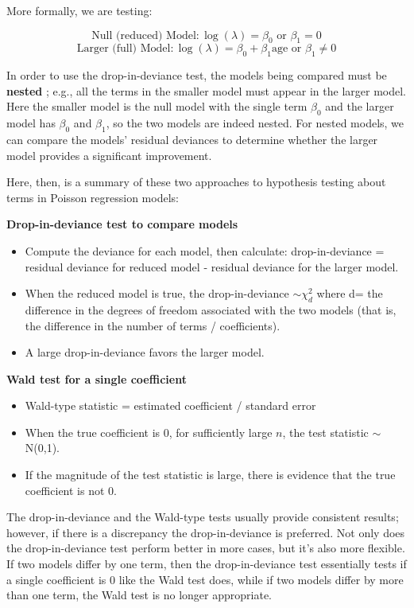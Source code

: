 \documentclass[
]{krantz}
\providecommand{\tightlist}{%
  \setlength{\itemsep}{0pt}\setlength{\parskip}{0pt}}
\begin{document}
More formally, we are testing:

\[\textrm{Null (reduced) Model}: \log(\lambda) = \beta_0 \textrm{ or } \beta_1=0\]
\[\textrm{Larger (full) Model}: \log(\lambda) = \beta_0 + \beta_1\textrm{age} \textrm{ or } \beta_1 \neq 0 \]

In order to use the drop-in-deviance test, the models being compared must be \textbf{nested} ; e.g., all the terms in the smaller model must appear in the larger model. Here the smaller model is the null model with the single term \(\beta_0\) and the larger model has \(\beta_0\) and \(\beta_1\), so the two models are indeed nested. For nested models, we can compare the models' residual deviances to determine whether the larger model provides a significant improvement.

Here, then, is a summary of these two approaches to hypothesis testing about terms in Poisson regression models:

\textbf{Drop-in-deviance test to compare models} 

\begin{itemize}
\tightlist
\item
  Compute the deviance for each model, then calculate: drop-in-deviance = residual deviance for reduced model - residual deviance for the larger model.
\item
  When the reduced model is true, the drop-in-deviance \(\sim \chi^2_d\)
  where d= the difference in the degrees of freedom associated with the two models (that is, the difference in the number of terms / coefficients).
\item
  A large drop-in-deviance favors the larger model.
\end{itemize}

\textbf{Wald test for a single coefficient} 

\begin{itemize}
\tightlist
\item
  Wald-type statistic = estimated coefficient / standard error
\item
  When the true coefficient is 0, for sufficiently large \(n\), the test statistic \(\sim\) N(0,1).
\item
  If the magnitude of the test statistic is large, there is evidence that the true coefficient is not 0.
\end{itemize}

The drop-in-deviance and the Wald-type tests usually provide consistent results; however, if there is a discrepancy the drop-in-deviance is preferred. Not only does the drop-in-deviance test perform better in more cases, but it's also more flexible. If two models differ by one term, then the drop-in-deviance test essentially tests if a single coefficient is 0 like the Wald test does, while if two models differ by more than one term, the Wald test is no longer appropriate.
\end{document}
